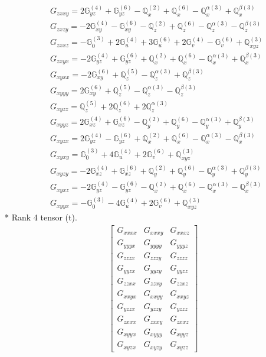 \documentclass[fleqn,8pt,landscape]{jsarticle}
\begin{document}
\begin{align*}
& G_{zxxy} = 2 \mathbb{G}_{yz}^{(4)} + \mathbb{G}_{yz}^{(6)} - \mathbb{Q}_{x}^{(2)} + \mathbb{Q}_{x}^{(6)} - \mathbb{Q}_{x}^{\alpha(3)} + \mathbb{Q}_{x}^{\beta(3)} \\
& G_{zxzy} = - 2 \mathbb{G}_{xy}^{(4)} - \mathbb{G}_{xy}^{(6)} - \mathbb{Q}_{z}^{(2)} + \mathbb{Q}_{z}^{(6)} - \mathbb{Q}_{z}^{\alpha(3)} - \mathbb{Q}_{z}^{\beta(3)} \\
& G_{zxxz} = - \mathbb{G}_{0}^{(3)} + 2 \mathbb{G}_{u}^{(4)} + 3 \mathbb{G}_{u}^{(6)} + 2 \mathbb{G}_{v}^{(4)} - \mathbb{G}_{v}^{(6)} + \mathbb{Q}_{xyz}^{(3)} \\
& G_{zxyx} = - 2 \mathbb{G}_{yz}^{(4)} + \mathbb{G}_{yz}^{(6)} + \mathbb{Q}_{x}^{(2)} + \mathbb{Q}_{x}^{(6)} - \mathbb{Q}_{x}^{\alpha(3)} + \mathbb{Q}_{x}^{\beta(3)} \\
& G_{xyxx} = - 2 \mathbb{G}_{xy}^{(6)} + \mathbb{Q}_{z}^{(5)} - \mathbb{Q}_{z}^{\alpha(3)} + \mathbb{Q}_{z}^{\beta(3)} \\
& G_{xyyy} = 2 \mathbb{G}_{xy}^{(6)} + \mathbb{Q}_{z}^{(5)} - \mathbb{Q}_{z}^{\alpha(3)} - \mathbb{Q}_{z}^{\beta(3)} \\
& G_{xyzz} = \mathbb{Q}_{z}^{(5)} + 2 \mathbb{Q}_{z}^{(6)} + 2 \mathbb{Q}_{z}^{\alpha(3)} \\
& G_{xyyz} = 2 \mathbb{G}_{xz}^{(4)} + \mathbb{G}_{xz}^{(6)} - \mathbb{Q}_{y}^{(2)} + \mathbb{Q}_{y}^{(6)} - \mathbb{Q}_{y}^{\alpha(3)} + \mathbb{Q}_{y}^{\beta(3)} \\
& G_{xyzx} = 2 \mathbb{G}_{yz}^{(4)} - \mathbb{G}_{yz}^{(6)} + \mathbb{Q}_{x}^{(2)} + \mathbb{Q}_{x}^{(6)} - \mathbb{Q}_{x}^{\alpha(3)} - \mathbb{Q}_{x}^{\beta(3)} \\
& G_{xyxy} = \mathbb{G}_{0}^{(3)} + 4 \mathbb{G}_{u}^{(4)} + 2 \mathbb{G}_{v}^{(6)} + \mathbb{Q}_{xyz}^{(3)} \\
& G_{xyzy} = - 2 \mathbb{G}_{xz}^{(4)} + \mathbb{G}_{xz}^{(6)} + \mathbb{Q}_{y}^{(2)} + \mathbb{Q}_{y}^{(6)} - \mathbb{Q}_{y}^{\alpha(3)} + \mathbb{Q}_{y}^{\beta(3)} \\
& G_{xyxz} = - 2 \mathbb{G}_{yz}^{(4)} - \mathbb{G}_{yz}^{(6)} - \mathbb{Q}_{x}^{(2)} + \mathbb{Q}_{x}^{(6)} - \mathbb{Q}_{x}^{\alpha(3)} - \mathbb{Q}_{x}^{\beta(3)} \\
& G_{xyyx} = - \mathbb{G}_{0}^{(3)} - 4 \mathbb{G}_{u}^{(4)} + 2 \mathbb{G}_{v}^{(6)} + \mathbb{Q}_{xyz}^{(3)}
\end{align*}
* Rank 4 tensor (t).
\begin{align*}
\begin{bmatrix} G_{xxxx} & G_{xxxy} & G_{xxxz} \\ G_{yyyx} & G_{yyyy} & G_{yyyz} \\ G_{zzzx} & G_{zzzy} & G_{zzzz} \\ G_{yyzx} & G_{yyzy} & G_{yyzz} \\ G_{zzxx} & G_{zzxy} & G_{zzxz} \\ G_{xxyx} & G_{xxyy} & G_{xxyz} \\ G_{yzzx} & G_{yzzy} & G_{yzzz} \\ G_{zxxx} & G_{zxxy} & G_{zxxz} \\ G_{xyyx} & G_{xyyy} & G_{xyyz} \\ G_{xyzx} & G_{xyzy} & G_{xyzz} \end{bmatrix}
\end{align*}
\end{document}
